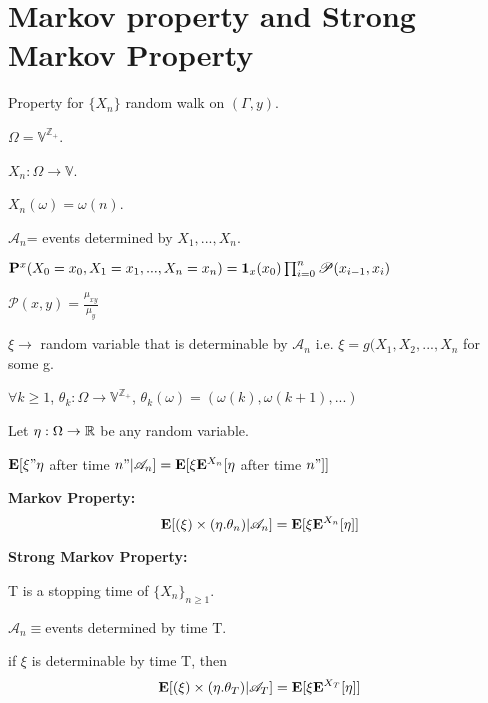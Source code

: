 \documentclass[main]{subfiles}
\begin{document}
\section{Markov property and Strong Markov Property}
Property for $\{X_n\}$ random walk on $(\Gamma,y)$.

$\Omega=\mathbb{V}^{\mathbb{Z_+}}$.

$X_n: \Omega \rightarrow \mathbb{V}$.

$X_n(\omega)= \omega(n)$.

$\mathscr{A}_n$= events determined by $X_1, ..., X_n$.

$\mathbf P^x(X_0=x_0, X_1=x_1,..., X_n=x_n)= \mathbf{1}_{x}(x_0)\prod_{i=0}^n \mathscr{P}(x_{i-1}, x_i)$

$\mathscr{P}(x,y)=\frac{\mu_{xy}}{\mu_y}$

$\xi \rightarrow$ random variable that is determinable by $\mathscr{A}_n$ i.e. $\xi=g(X_1, X_2,..., X_n$ for some g.

$\forall k \geq 1$, $\theta_k: \Omega \rightarrow \mathbb{V}^{\mathbb{Z_+}}$, $\theta_k(\omega)= (\omega(k), \omega(k+1),...)$

Let $\eta: \Omega \rightarrow \mathbb R$ be any random variable.

$\mathbf E[\xi"\eta$ after time $n"|\mathscr{A}_n]=\mathbf E[\xi\mathbf E^{X_n}[\eta$ after time $n"]]$

\textbf{Markov Property:}
\begin{equation}
    \mathbf E[(\xi)\times (\eta.\theta_n)|\mathscr{A}_n ]=\mathbf E[\xi\mathbf E^{X_n}[\eta]]
\end{equation}

\textbf{Strong Markov Property:}

T is a stopping time of $\{X_n\}_{n\geq 1}$.

$\mathscr{A}_n \equiv $events determined by time T.

if $\xi$ is determinable by time T, then
\begin{equation}
    \mathbf E[(\xi)\times (\eta.\theta_T)|\mathscr{A}_T ]=\mathbf E[\xi\mathbf E^{X_T}[\eta]]
\end{equation}
\end{document}
